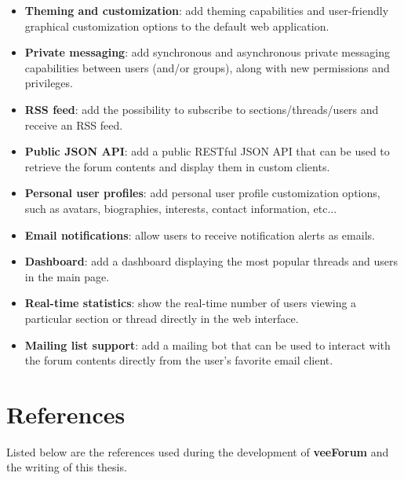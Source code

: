 \documentclass[12pt]{report}
\renewcommand\emph{\textbf}
\begin{document}
                \begin{itemize}
                    \item \emph{Theming and customization}: add theming capabilities and user-friendly graphical customization options to the default web application.
                    \item \emph{Private messaging}: add synchronous and asynchronous private messaging capabilities between users (and/or groups), along with new permissions and privileges.
                    \item \emph{RSS feed}: add the possibility to subscribe to sections/threads/users and receive an RSS feed.
                    \item \emph{Public JSON API}: add a public RESTful JSON API that can be used to retrieve the forum contents and display them in custom clients.
                    \item \emph{Personal user profiles}: add personal user profile customization options, such as avatars, biographies, interests, contact information, etc...
                    \item \emph{Email notifications}: allow users to receive notification alerts as emails.
                    \item \emph{Dashboard}: add a dashboard displaying the most popular threads and users in the main page.
                    \item \emph{Real-time statistics}: show the real-time number of users viewing a particular section or thread directly in the web interface.
                    \item \emph{Mailing list support}: add a mailing bot that can be used to interact with the forum contents directly from the user's favorite email client.
                \end{itemize}

        \chapter{References}
            
            Listed below are the references used during the development of \emph{veeForum} and the writing of this thesis.
\end{document}
